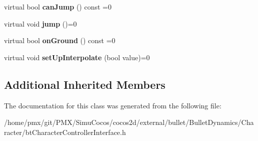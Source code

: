 \begin{DoxyCompactItemize}
virtual bool {\bfseries can\+Jump} () const =0
\item 
\mbox{\label{classbtCharacterControllerInterface_a639aa33df3cbb175e7053b64206027ab}} 
virtual void {\bfseries jump} ()=0
\item 
\mbox{\label{classbtCharacterControllerInterface_a943e28cae25e3731a5e0145173ecc8a2}} 
virtual bool {\bfseries on\+Ground} () const =0
\item 
\mbox{\label{classbtCharacterControllerInterface_a6670c16b38f52a80c03f4a3ebb476699}} 
virtual void {\bfseries set\+Up\+Interpolate} (bool value)=0
\end{DoxyCompactItemize}
\subsection*{Additional Inherited Members}


The documentation for this class was generated from the following file\+:\begin{DoxyCompactItemize}
\item 
/home/pmx/git/\+P\+M\+X/\+Simu\+Cocos/cocos2d/external/bullet/\+Bullet\+Dynamics/\+Character/bt\+Character\+Controller\+Interface.\+h\end{DoxyCompactItemize}
